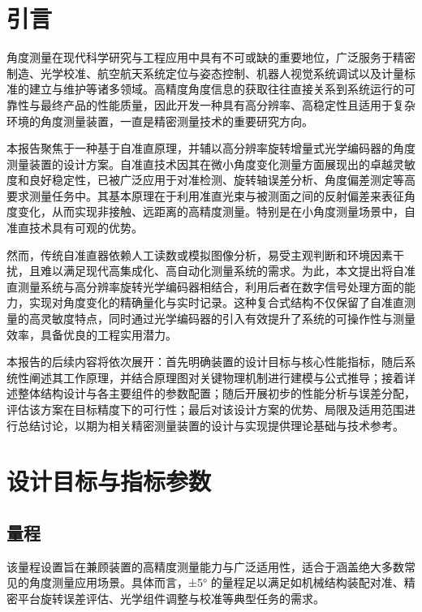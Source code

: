 
\section{引言}

角度测量在现代科学研究与工程应用中具有不可或缺的重要地位，广泛服务于精密制造、光学校准、航空航天系统定位与姿态控制、机器人视觉系统调试以及计量标准的建立与维护等诸多领域。高精度角度信息的获取往往直接关系到系统运行的可靠性与最终产品的性能质量，因此开发一种具有高分辨率、高稳定性且适用于复杂环境的角度测量装置，一直是精密测量技术的重要研究方向。

本报告聚焦于一种基于自准直原理，并辅以高分辨率旋转增量式光学编码器的角度测量装置的设计方案。自准直技术因其在微小角度变化测量方面展现出的卓越灵敏度和良好稳定性，已被广泛应用于对准检测、旋转轴误差分析、角度偏差测定等高要求测量任务中。其基本原理在于利用准直光束与被测面之间的反射偏差来表征角度变化，从而实现非接触、远距离的高精度测量。特别是在小角度测量场景中，自准直技术具有可观的优势。

然而，传统自准直器依赖人工读数或模拟图像分析，易受主观判断和环境因素干扰，且难以满足现代高集成化、高自动化测量系统的需求。为此，本文提出将自准直测量系统与高分辨率旋转光学编码器相结合，利用后者在数字信号处理方面的能力，实现对角度变化的精确量化与实时记录。这种复合式结构不仅保留了自准直测量的高灵敏度特点，同时通过光学编码器的引入有效提升了系统的可操作性与测量效率，具备优良的工程实用潜力。

本报告的后续内容将依次展开：首先明确装置的设计目标与核心性能指标，随后系统性阐述其工作原理，并结合原理图对关键物理机制进行建模与公式推导；接着详述整体结构设计与各主要组件的参数配置；随后开展初步的性能分析与误差分配，评估该方案在目标精度下的可行性；最后对该设计方案的优势、局限及适用范围进行总结讨论，以期为相关精密测量装置的设计与实现提供理论基础与技术参考。

\section{设计目标与指标参数}

\subsection{量程}


该量程设置旨在兼顾装置的高精度测量能力与广泛适用性，适合于涵盖绝大多数常见的角度测量应用场景。具体而言，±5° 的量程足以满足如机械结构装配对准、精密平台旋转误差评估、光学组件调整与校准等典型任务的需求。

